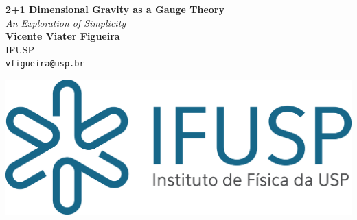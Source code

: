 \documentclass[a0,portrait]{a0poster}
\begin{document}


\begin{minipage}[b]{0.71\linewidth}
\veryHuge \color{NavyBlue} \textbf{2+1 Dimensional Gravity as a Gauge Theory} \color{Black}\\ %
\Huge\textit{An Exploration of Simplicity}\\[2cm] %
\huge \textbf{Vicente Viater Figueira}\\[0.5cm] %
\huge IFUSP\\[0.4cm] %
\Large \texttt{vfigueira@usp.br}\\
\end{minipage}
%
\begin{minipage}[b]{0.29\linewidth}
\includegraphics[width=20cm]{logohorizontalifusp.png}\\
\vspace{3cm}
\end{minipage}

\vspace{1cm} %

\end{document}
